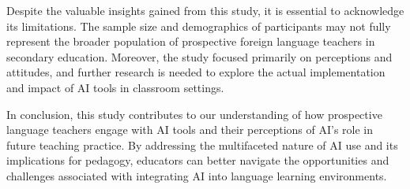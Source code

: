 Despite the valuable insights gained from this study, it is essential to
acknowledge its limitations. The sample size and demographics of
participants may not fully represent the broader population of
prospective foreign language teachers in secondary education. Moreover,
the study focused primarily on perceptions and attitudes, and further
research is needed to explore the actual implementation and impact of AI
tools in classroom settings.

In conclusion, this study contributes to our understanding of how
prospective language teachers engage with AI tools and their perceptions
of AI's role in future teaching practice. By addressing
the multifaceted nature of AI use and its implications for pedagogy,
educators can better navigate the opportunities and challenges
associated with integrating AI into language learning environments.
